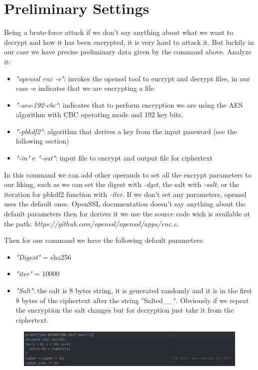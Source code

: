 \documentclass[11pt]{article}
\begin{document}
\section{Preliminary Settings}
Being a brute-force attack if we don't say anything about what we want to decrypt and how it has been encrypted, it is very hard to attack it. But luckily in our case we have precise preliminary data given by the command above. Analyze it:

\begin{itemize}
\item {\em "openssl enc -e"}: invokes the openssl tool to encrypt and decrypt files, in our case -e indicates that we are encrypting a file.
\item {\em "-aes-192-cbc"}: indicates that to perform encryption we are using the AES algorithm with CBC operating mode and 192 key bits.
\item {\em "-pbkdf2"}: algorithm that derives a key from the input password (see the following section)
\item {\em "-in"} e {\em "-out"}: input file to encrypt and output file for ciphertext
\end{itemize}

In this command we can add other operands to set all the encrypt parameters to our liking, such as we can set the digest with {\em -dgst}, the salt with {\em -salt}, or the iteration for pbkdf2 function with {\em -iter}. If we don't set any parameters, openssl uses the default ones. OpenSSL documentation doesn't say anything about the default parameters then for derives it we use the source code wich is available at the path: {\em https://github.com/openssl/openssl/apps/enc.c}.

Then for our command we have the following default parameters:
\begin{itemize}
\item {\em "Digest"} = sha256
\item {\em "iter"} = 10000
\item {\em "Salt"}: the salt is 8 bytes string, it is generated randomly and it is in the first 8 bytes of the ciphertext after the string "Salted\_\_". Obviously if we repeat the encryption the salt changes but for decryption just take it from the ciphertext.
\end{itemize}

\begin{figure}[!ht]
  \includegraphics[width=1\textwidth]{pic1-hw2-1635747}
  \label{fig:Salt extraction}
\end{figure}
\end{document}
